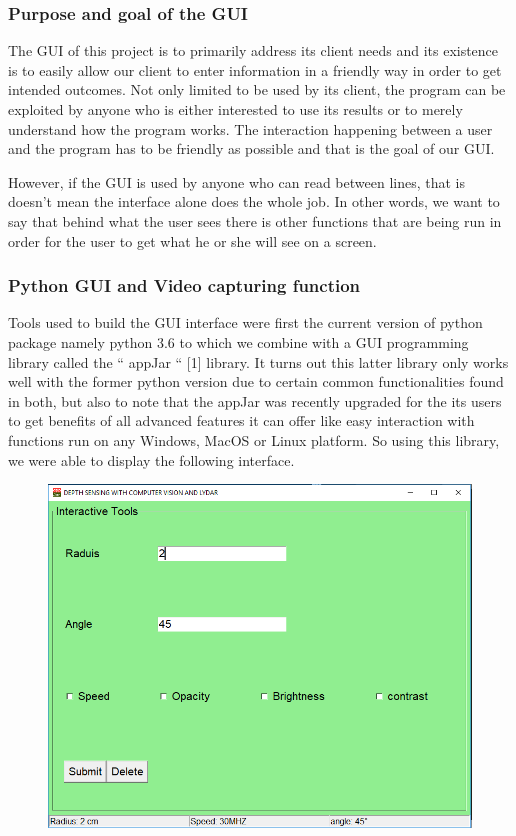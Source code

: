 \documentclass[onecolumn, draftclsnofoot,10pt, compsoc]{IEEEtran}
\begin{document}
\begin{singlespace}
		\subsubsection{Purpose and goal of the GUI}	
			The GUI of this project is to primarily address its client needs and its existence is  to easily allow our client to enter information in a friendly way in order to get intended outcomes. Not only limited to be used by its client, the program can be exploited by anyone who is  either interested to use its results or to merely understand how the program works. The  interaction happening between a user and the program has to be friendly as possible and that is the goal of our GUI.

	However, if the GUI is used by anyone who can read between lines, that is doesn’t mean the interface alone does the whole job. In other words, we want to say that behind what the user sees there is other functions that are being run in order for the user to get what he or she will see on a screen.
	
		\subsubsection{ Python GUI and  Video capturing function}
			Tools used to build the GUI interface were first the current version of python package namely python 3.6 to which we combine with a GUI programming library  called the “ appJar “ [1] library. It  turns out this latter library only works well with the former python version due to certain common functionalities found in both, but also to note that the appJar was recently upgraded for the its users to get benefits of all advanced features it can offer like easy interaction with functions run on any  Windows, MacOS or Linux platform.  
So using this library, we were able to  display the following interface.

			\begin{figure}[here]
				\includegraphics[scale=0.4, width=\textwidth]{userinterface.png}
				\label{gui}
			\end{figure}
			

\end{singlespace}
\end{document}
